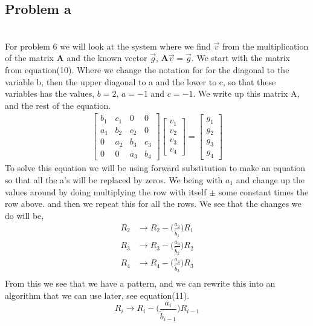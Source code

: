 \documentclass[english,notitlepage]{revtex4-1}  %
\begin{document}
 \subsection*{Problem a}\
 \\
 For problem 6 we will look at the system where we find $\vec{v}$ from the multiplication of the matrix \textbf{A} and the known vector $\vec{g}$, $\mathbf{A}\vec{v} = \vec{g}$. We start with the matrix from equation(10). Where we change the notation for for the diagonal to the variable b, then the upper diagonal to a and the lower to c, so that these variables has the values, $b = 2$, $a = -1$ and $c = -1$. We write up this matrix A, and the rest of the equation.
\begin{align*}
 \begin{bmatrix}
 b_1 & c_1 & 0 & 0 \\
 a_1 & b_2 & c_2 & 0 \\
 0 & a_2 & b_3 & c_3 \\
 0 & 0 & a_3 & b_4
 \end{bmatrix} \begin{bmatrix}
 v_1\\
 v_2\\
 v_3\\
 v_4
 \end{bmatrix} = \begin{bmatrix}
 g_1\\
 g_2\\
 g_3\\
 g_4
 \end{bmatrix}
\end{align*}
 To solve this equation we will be using forward substitution to make an equation so that all the a's will be replaced by zeros. We being with $a_1$ and change up the values around by doing multiplying the row with itself $\pm$ some constant times the row above. and then we repeat this for all the rows. We see that the changes we do will be,
 \begin{align*}
 R_2 &\rightarrow R_2 - \bigg(\frac{a_2}{\tilde{b}_1} \bigg) R_1\\
 R_3 &\rightarrow R_3 - \bigg(\frac{a_3}{\tilde{b}_2} \bigg) R_2\\
 R_4 &\rightarrow R_4 - \bigg(\frac{a_4}{\tilde{b}_3} \bigg) R_3\\
 \end{align*}
 From this we see that we have a pattern, and we can rewrite this into an algorithm that we can use later, see equation(11).
 \begin{equation}
 R_i \rightarrow R_i - \bigg(\frac{a_i}{\tilde{b}_{i - 1}} \bigg) R_{i - 1}
 \end{equation}
\end{document}

